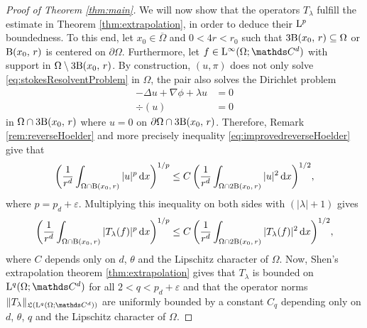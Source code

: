 \begin{proof}[Proof of Theorem \ref{thm:main}]
  We will now show that the operators $T_\lambda$ fulfill the estimate in Theorem \ref{thm:extrapolation}, in order to deduce their $\mathrm{L}^p$ boundedness.
  To this end, let $x_0 \in \overline \Omega$ and $0 < 4r < r_0$ such that $3 \mathrm{B}(x_0,\, r) \subseteq \Omega$ or $\mathrm{B}(x_0,\, r)$ is centered on $\partial\Omega$.
  Furthermore, let $f \in \Ell^\infty(\Omega; \C^d)$ with support in $\Omega \setminus 3 \mathrm{B}(x_0,\, r)$.
  By construction, $(u,\pi)$ does not only solve \eqref{eq:stokesResolventProblem} in $\Omega$, the pair also solves the Dirichlet problem
  \begin{align*}
    -\Delta u + \nabla \phi + \lambda u &= 0 \\
    \div(u)&= 0
  \end{align*}
  in $\Omega \cap 3 \mathrm{B}(x_0,\, r)$ where $u = 0$ on $\partial\Omega \cap 3 \mathrm{B}(x_0,\, r)$.
  Therefore, Remark \ref{rem:reverseHoelder} and more precisely inequality \eqref{eq:improvedreverseHoelder} give that
  \begin{align*}
    \bigg( \frac{1}{r^d} \int_{\Omega \cap \mathrm{B}(x_0,\, r)} |u|^p \, {\operatorname{d}\!{x}} \bigg)^{1/p} \leq C\, \bigg( \frac{1}{r^d} \int_{\Omega \cap 2 \mathrm{B}(x_0,\, r)} |u|^2 \, {\operatorname{d}\!{x}} \bigg)^{1/2},
  \end{align*}
  where $p = p_d + \varepsilon$.
  Multiplying this inequality on both sides with $(|\lambda| + 1)$ gives
  \begin{align}
    \label{eq:tlambdaEstimate}
    \bigg( \frac{1}{r^d} \int_{\Omega \cap \mathrm{B}(x_0,\, r)} |T_\lambda(f)|^p \, {\operatorname{d}\!{x}} \bigg)^{1/p} \leq C\, \bigg( \frac{1}{r^d} \int_{\Omega \cap 2 \mathrm{B}(x_0,\, r)} |T_\lambda(f)|^2 \, {\operatorname{d}\!{x}} \bigg)^{1/2},
  \end{align}
  where $C$ depends only on $d$, $\theta$ and the Lipschitz character of $\Omega$.
  Now, Shen's extrapolation theorem \ref{thm:extrapolation} gives that $T_\lambda$ is bounded on $\Ell^q(\Omega; \C^d)$ for all $2 < q < p_d + \varepsilon$ and that the operator norms $\|T_\lambda\|_{\Li(\Ell^q(\Omega; \C^d))}$ are uniformly bounded by a constant $C_q$ depending only on $d$, $\theta$, $q$ and the Lipschitz character of $\Omega$.


\end{proof}
